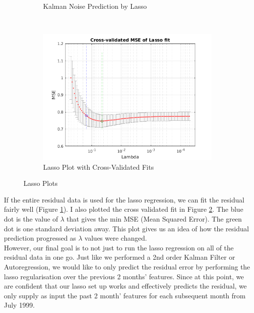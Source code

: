 \documentclass[11pt, fleqn]{article}
\begin{document}
\begin{figure}[!h]
\begin{subfigure}[b]{0.3\textwidth}
	\caption{Kalman Noise Prediction by Lasso}
	\label{fig:noise-prediction}
    \end{subfigure}
 	~ 
	\begin{subfigure}[b]{0.3\textwidth}
        \includegraphics[width=\textwidth]{mse-lasso.png}
	\caption{Lasso Plot with Cross-Validated Fits}
	\label{fig:mse-lasso}
    \end{subfigure}
	\caption{Lasso Plots}
	\label{fig:lasso-figs}
\end{figure}

If the entire residual data is used for the lasso regression, we can fit the residual fairly well (Figure \ref{fig:noise-prediction}). I also plotted the cross validated fit in Figure \ref{fig:mse-lasso}. The blue dot is the value of $\lambda$ that gives the min MSE (Mean Squared Error). The green dot is one standard deviation away. This plot gives us an idea of how the residual prediction progressed as $\lambda$ values were changed.\\

However, our final goal is to not just to run the lasso regression on all of the residual data in one go. Just like we performed a 2nd order Kalman Filter or Autoregression, we would like to only predict the residual error by performing the lasso regularisation over the previous 2 months' features. Since at this point, we are confident that our lasso set up works and effectively predicts the residual, we only supply as input the past 2 month' features for each subsequent month from July 1999.
\end{document}
